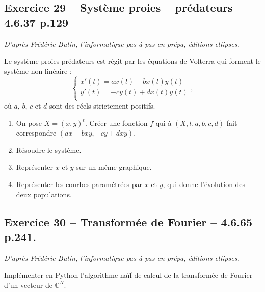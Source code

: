 \documentclass[10pt,fleqn]{article} %
\begin{document}
\begin{multicols}{2}
\subsection*{Exercice 29 -- Système proies -- prédateurs -- 4.6.37 p.129}
\begin{flushright}
\textit{D'après Frédéric Butin, l'informatique pas à pas en prépa, éditions ellipses.}
\end{flushright}
Le système proies-prédateurs est régit par les équations de Volterra qui forment le système non linéaire :
$$
\left\{
\begin{array}{l}
x'(t)=ax(t)-bx(t)y(t) \\
y'(t)=-cy(t)+dx(t)y(t) \\
\end{array}
\right. ,
$$
où $a$, $b$, $c$ et $d$ sont des réels strictement positifs. 
\begin{enumerate}
\item On pose $X=(x,y)^t$. Créer une fonction $f$ qui à $(X,t,a,b,c,d)$ fait correspondre $(ax-bxy,-cy+dxy)$.
\item Résoudre le système.
\item Représenter $x$ et $y$ sur un même graphique. 
\item Représenter les courbes paramétrées par $x$ et $y$, qui donne l'évolution des deux populations.
\end{enumerate}

\subsection*{Exercice 30 -- Transformée de Fourier -- 4.6.65 p.241.}
\begin{flushright}
\textit{D'après Frédéric Butin, l'informatique pas à pas en prépa, éditions ellipses.}
\end{flushright}
Implémenter en Python l'algorithme naïf de calcul de la transformée de Fourier d'un vecteur de $\mathbb{C}^N$.


\end{multicols}
\end{document}
